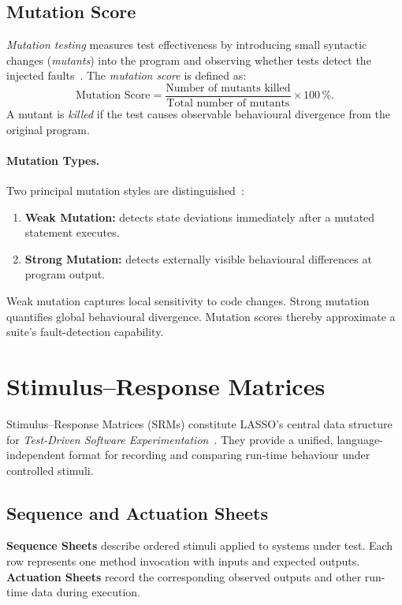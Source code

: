 \subsection{Mutation Score}

\emph{Mutation testing} measures test effectiveness by introducing small syntactic changes (\emph{mutants}) into the program and observing whether tests detect the injected faults~\cite{jia2011}.  
The \emph{mutation score} is defined as:
\[
\text{Mutation Score} =
\frac{\text{Number of mutants killed}}{\text{Total number of mutants}} \times 100\,\%.
\]
A mutant is \emph{killed} if the test causes observable behavioural divergence from the original program.

\paragraph{Mutation Types.}
Two principal mutation styles are distinguished~\cite{offutt2000}:
\begin{enumerate}
  \item \textbf{Weak Mutation:} detects state deviations immediately after a mutated statement executes.
  \item \textbf{Strong Mutation:} detects externally visible behavioural differences at program output.
\end{enumerate}

Weak mutation captures local sensitivity to code changes. Strong mutation quantifies global behavioural divergence. Mutation scores thereby approximate a suite's fault-detection capability.

\section{Stimulus--Response Matrices}\label{sec:srm}

Stimulus--Response Matrices (SRMs) constitute LASSO’s central data structure for \emph{Test-Driven Software Experimentation}~\cite{Kessel2022}. They provide a unified, language-independent format for recording and comparing run-time behaviour under controlled stimuli.

\subsection{Sequence and Actuation Sheets}

\textbf{Sequence Sheets} describe ordered stimuli applied to systems under test. Each row represents one method invocation with inputs and expected outputs.  
\textbf{Actuation Sheets} record the corresponding observed outputs and other run-time data during execution.

